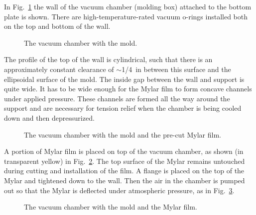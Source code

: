 In Fig.~\ref{vacuum} the wall of the vacuum chamber (molding box) attached 
to the bottom plate is shown.  There are high-temperature-rated vacuum 
o-rings installed both on the top and bottom of the wall.
 
\begin{figure}
\begin{center}
\caption{\small{The vacuum chamber with the mold.}}
\label{vacuum}
\end{center}
\end{figure}  

The profile of the top of the wall is cylindrical, such that there is an 
approximately constant clearance of $\sim$1/4~in between this surface and 
the ellipsoidal surface of the mold.  The inside gap between the wall and 
support is quite wide.  It has to be wide enough for the Mylar film to 
form concave channels under applied pressure.  These channels are formed all 
the way around the support and are necessary for tension relief when the  
chamber is being cooled down and then depressurized.

\begin{figure}
\begin{center}
\caption{\small{The vacuum chamber with the mold and the pre-cut Mylar film.}}
\label{Mylar}
\end{center}
\end{figure} 

A portion of Mylar film is placed on top of the vacuum chamber, as shown 
(in transparent yellow) in Fig.~\ref{Mylar}. The top surface of the 
Mylar remains untouched during cutting and installation of the film. 
A flange is placed on the top of the Mylar and tightened down to the wall.
Then the air in the chamber is pumped out so that the Mylar is 
deflected under atmospheric pressure, as in Fig.~\ref{Mylar_var}.

\begin{figure}
\begin{center}
\caption{\small{The vacuum chamber with the mold and the Mylar film.}}
\label{Mylar_var}
\end{center}
\end{figure} 

